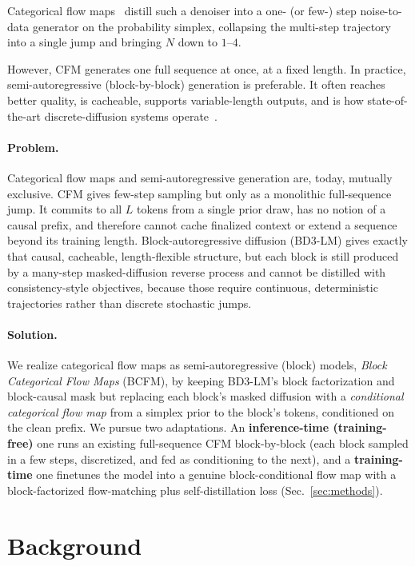 \documentclass[twocolumn]{style}
\begin{document}
Categorical flow maps~\citep{roos2026cfm, potaptchik2026dfm, lee2026onestep} distill such a denoiser into a one- (or few-) step noise-to-data generator on the probability simplex, collapsing the multi-step trajectory into a single jump and bringing $N$ down to $1$--$4$.

However, CFM generates one full sequence at once, at a fixed length. In practice, semi-autoregressive (block-by-block) generation is preferable. It often reaches better quality, is cacheable, supports variable-length outputs, and is how state-of-the-art discrete-diffusion systems operate~\citep{arriola2025block, bie2025llada2, deepmind2026diffgemma}.

\paragraph{Problem.} Categorical flow maps and semi-autoregressive generation are, today, mutually exclusive. CFM gives few-step sampling but only as a monolithic full-sequence jump. It commits to all $L$ tokens from a single prior draw, has no notion of a causal prefix, and therefore cannot cache finalized context or extend a sequence beyond its training length. Block-autoregressive diffusion (BD3-LM) gives exactly that causal, cacheable, length-flexible structure, but each block is still produced by a many-step masked-diffusion reverse process and cannot be distilled with consistency-style objectives, because those require continuous, deterministic trajectories rather than discrete stochastic jumps.

\paragraph{Solution.} We realize categorical flow maps as semi-autoregressive (block) models, \emph{Block Categorical Flow Maps} (BCFM), by keeping BD3-LM's block factorization and block-causal mask but replacing each block's masked diffusion with a \emph{conditional categorical flow map} from a simplex prior to the block's tokens, conditioned on the clean prefix. We pursue two adaptations. An \textbf{inference-time (training-free)} one runs an existing full-sequence CFM block-by-block (each block sampled in a few steps, discretized, and fed as conditioning to the next), and a \textbf{training-time} one finetunes the model into a genuine block-conditional flow map with a block-factorized flow-matching plus self-distillation loss (Sec.~\ref{sec:methods}).


\section{Background}
\end{document}
